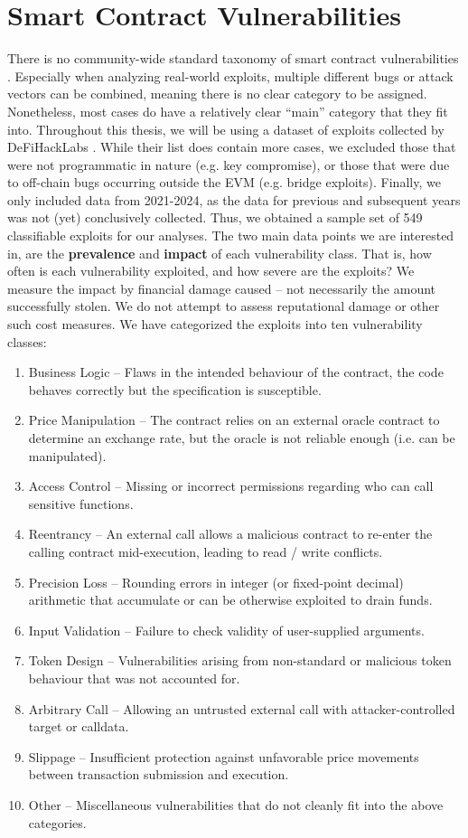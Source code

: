 \section{Smart Contract Vulnerabilities}
There is no community-wide standard taxonomy of smart contract vulnerabilities \cite{taxonomy}. Especially when analyzing real-world exploits, multiple different bugs or attack vectors can be combined, meaning there is no clear category to be assigned. Nonetheless, most cases do have a relatively clear ``main'' category that they fit into. Throughout this thesis, we will be using a dataset of exploits collected by DeFiHackLabs \cite{dataset}. While their list does contain more cases, we excluded those that were not programmatic in nature (e.g. key compromise), or those that were due to off-chain bugs occurring outside the EVM (e.g. bridge exploits). Finally, we only included data from 2021-2024, as the data for previous and subsequent years was not (yet) conclusively collected. Thus, we obtained a sample set of 549 classifiable exploits for our analyses. The two main data points we are interested in, are the \textbf{prevalence} and \textbf{impact} of each vulnerability class. That is, how often is each vulnerability exploited, and how severe are the exploits? We measure the impact by financial damage caused -- not necessarily the amount successfully stolen. We do not attempt to assess reputational damage or other such cost measures. We have categorized the exploits into ten vulnerability classes:
\begin{enumerate}
  \item Business Logic -- Flaws in the intended behaviour of the contract, the code behaves correctly but the specification is susceptible.
  \item Price Manipulation -- The contract relies on an external oracle contract to determine an exchange rate, but the oracle is not reliable enough (i.e. can be manipulated).
  \item Access Control -- Missing or incorrect permissions regarding who can call sensitive functions.
  \item Reentrancy -- An external call allows a malicious contract to re-enter the calling contract mid-execution, leading to read / write conflicts.
  \item Precision Loss -- Rounding errors in integer (or fixed-point decimal) arithmetic that accumulate or can be otherwise exploited to drain funds.
  \item Input Validation -- Failure to check validity of user-supplied arguments.
  \item Token Design -- Vulnerabilities arising from non-standard or malicious token behaviour that was not accounted for.
  \item Arbitrary Call -- Allowing an untrusted external call with attacker-controlled target or calldata.
  \item Slippage -- Insufficient protection against unfavorable price movements between transaction submission and execution.
  \item Other -- Miscellaneous vulnerabilities that do not cleanly fit into the above categories.
\end{enumerate}

